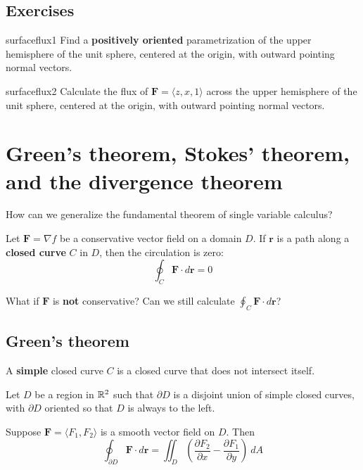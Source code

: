 \subsection{Exercises}

\begin{problem}{surfaceflux1}
     Find a \textbf{positively oriented} parametrization of the upper hemisphere of the unit sphere, centered at the origin, with outward pointing normal vectors.
\end{problem}

\begin{problem}{surfaceflux2}
     Calculate the flux of $\bm{F} = \langle z, x, 1 \rangle$ across the upper hemisphere of the unit sphere, centered at the origin, with outward pointing normal vectors.
\end{problem}




\section{Green's theorem, Stokes' theorem, and the divergence theorem}

\begin{motivating}
    How can we generalize the fundamental theorem of single variable calculus?
\end{motivating}

\begin{theorem}
    Let $\bm{F} = \nabla f$ be a conservative vector field on a domain $D$. If $\bm{r}$ is a path along a \textbf{closed curve} $C$ in $D$, then the circulation is zero:
    $$\oint_C \bm{F} \cdot d\bm{r} = 0$$
    \end{theorem}

What if $\bm{F}$ is \textbf{not} conservative?  Can we still calculate $\oint_C \bm{F} \cdot d\bm{r}$?


\subsection{Green's theorem}


\begin{definition}
    A \textbf{simple} closed curve $C$ is a closed curve that does not intersect itself.
\end{definition}

\begin{theorem}
    Let $D$ be a region in $\mathbb{R}^2$ such that $\partial D$ is a disjoint union of simple closed curves, with $\partial D$ oriented so that $D$ is always to the left.
    
    \vspace{1em}
    
    
    Suppose $\bm{F} = \langle F_1, F_2 \rangle$ is a smooth vector field on $D$.  Then
    $$\oint_{\partial D} \bm{F} \cdot d\bm{r} = \iint_D \left(\frac{\partial F_2}{\partial x} - \frac{\partial F_1}{\partial y}\right) \ dA$$
    
    \end{theorem}


